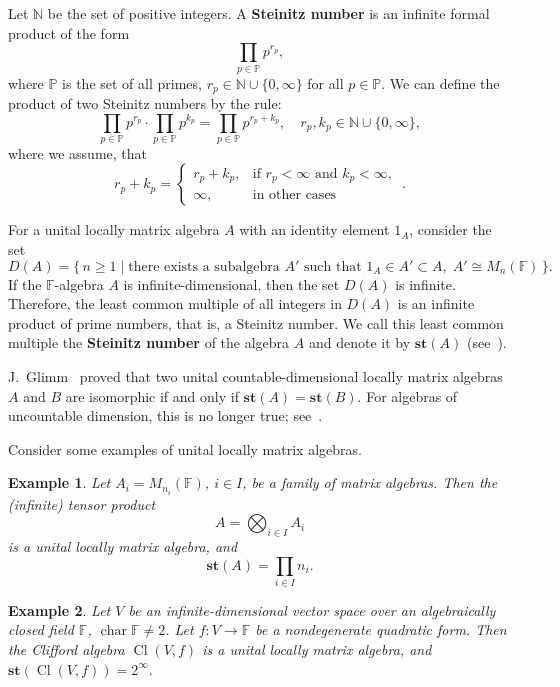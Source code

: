 \documentclass[12pt]{amsart}
\newtheorem{example}{Example}
\begin{document}
{	
Let $ \mathbb{N} $ be the set of positive integers.	 A   \textbf{Steinitz number} \cite{ST}   is an infinite formal
	product of the form
\begin{equation}\label{Eq__1} \prod_{p\in \mathbb{P}} p^{r_p}, \end{equation}
	where $ \mathbb{P} $ is the set of all primes, $ r_p \in  \mathbb{N} \cup \{0,\infty\} $ for all $p\in \mathbb{P}$.
	We can define the product of two Steinitz numbers by the rule:
	$$ \prod_{p\in \mathbb{P}} p^{r_p} \cdot  \prod_{p\in \mathbb{P}} p^{k_p}= \prod_{p\in \mathbb{P}} p^{r_p+k_p}, \quad r_p, k_p \in  \mathbb{N} \cup \{0,\infty\},  $$
	where we assume, that
	$$r_p+k_p=\begin{cases}
		r_p+k_p, & \text{if  $r_p < \infty$ and $k_p < \infty$, } \\
		\infty, & \text{in other cases}
	\end{cases}.$$
	

	
	

		
		For a unital locally matrix algebra $A$ with an identity element $1_A$, consider the set
		\[
		D(A) = \{\, n \ge 1 \mid \text{there exists a subalgebra } A' \text{ such that } 1_A \in A' \subset A, \; A' \cong M_n(\mathbb{F}) \,\}.
		\]  If the $\mathbb{F}$-algebra $A$ is infinite-dimensional, then the set $D(A)$ is infinite. Therefore, the least common multiple of all integers in $D(A)$ is an infinite product of prime numbers, that is, a Steinitz number. We call this least common multiple the \textbf{Steinitz number} of the algebra $A$ and denote it by $\mathbf{st}(A)$  (see~\cite{BezOl,Glimm}).  
		
		
		
		
			J.~Glimm~\cite{Glimm} proved that two unital countable-dimensional locally matrix algebras $A$ and $B$ are isomorphic if and only if $\mathbf{st}(A) =\mathbf{st}(B)$.  
			For algebras of uncountable dimension, this is no longer true; see~\cite{BezOl}.
	
	Consider some examples of unital locally matrix algebras.
			
\begin{example}\label{Ex_1}
	Let $A_i = M_{n_i}(\mathbb{F})$, $i \in I$, be a family of matrix algebras.
	Then the (infinite) tensor product
	\[
	A = \bigotimes_{i \in I} A_i
	\]
	is a unital locally matrix algebra, and
	\[
\mathbf{st}(A) = \prod_{i \in I} n_i.
	\]  \end{example}
	
\begin{example}\label{Ex_2}
	Let $V$ be an infinite-dimensional vector space over an algebraically closed field $\mathbb{F}$, 
	$\operatorname{char} \mathbb{F} \ne 2$.
	Let $f \colon V \to \mathbb{F}$ be a nondegenerate quadratic form.
	Then the Clifford algebra $	\operatorname{Cl}(V, f)$	is a unital locally matrix algebra, and $	\mathbf{st}(\operatorname{Cl}(V, f)) = 2^{\infty}.$ \end{example}
	
}
\end{document}
